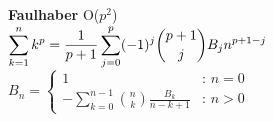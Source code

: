 \begin{large}
  \textbf{Faulhaber} O($p^2$) \\
  ${\displaystyle \sum _{k=1}^{n}k^{p}={1 \over p+1}\sum _{j=0}^{p}(-1)^{j}{p+1 \choose j}B_{j}n^{p+1-j}}$
  \hfill
  ${\displaystyle B_{n}={\begin{cases}{1}&{\text{: }}n=0\\{\displaystyle -\sum _{k=0}^{n-1}{n \choose k}{\frac {B_{k}}{n-k+1}}}&{\text{: }}n>0\end{cases}}}$
\end{large}

